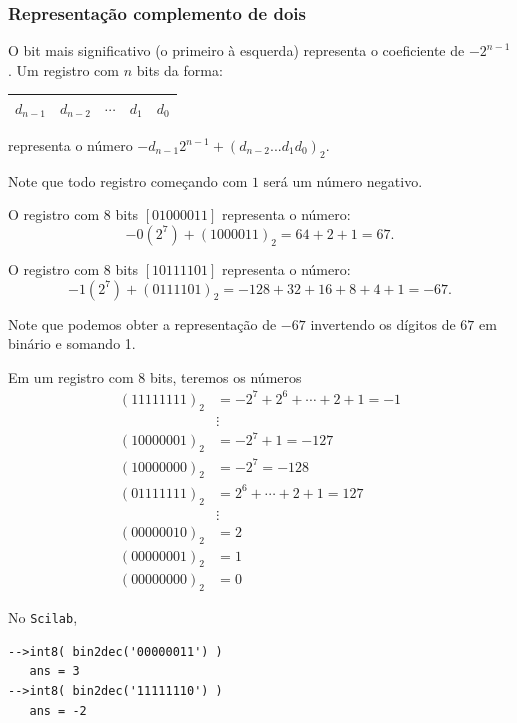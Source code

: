 \subsubsection{Representação complemento de dois}
O bit mais significativo (o primeiro à esquerda) representa o coeficiente de $-2^{n-1}$.  Um registro com $n$ bits da forma:
\begin{tabular}{|c|c|c|c|c|} \hline
  $d_{n-1}$ & $d_{n-2}$ & $\cdots$ & $d_1$ & $d_0$\\\hline
\end{tabular}  
representa o número $-d_{n-1}2^{n-1}+(d_{n-2}...d_1d_0)_2$. 

Note que todo registro começando com $1$ será um número negativo.

\begin{ex}
 O registro com $8$ bits $[01000011]$ representa o número:
 \begin{equation*}
   -0(2^7)+(1000011)_2=64+2+1=67.
 \end{equation*}
 
 O registro com $8$ bits $[10111101]$ representa o número:
 \begin{equation*}
   -1(2^7)+(0111101)_2=-128+ 32+16+8+4+1=-67.
 \end{equation*}

 Note que podemos obter a representação de $-67$ invertendo os dígitos de $67$ em binário e somando 1.
\end{ex}

\begin{ex}
Em um registro com $8$ bits, teremos os números
\begin{equation*}
  \begin{split}
    (11111111)_2 &= -2^7+2^{6}+\cdots+2+1=-1\\
    &\vdots   \\
    (10000001)_2 &= -2^7+1 = -127 \\
    (10000000)_2 &= -2^7   = -128 \\
    (01111111)_2 &= 2^6+\cdots+2+1=127 \\
    &\vdots   \\
    (00000010)_2 &= 2 \\
    (00000001)_2 &= 1 \\
    (00000000)_2 &= 0
  \end{split}
\end{equation*}
\end{ex}

\ifisscilab
\begin{ex}
  No \verb+Scilab+,
\begin{verbatim}
-->int8( bin2dec('00000011') )
   ans = 3
-->int8( bin2dec('11111110') )
   ans = -2
\end{verbatim}
\end{ex}
\fi



